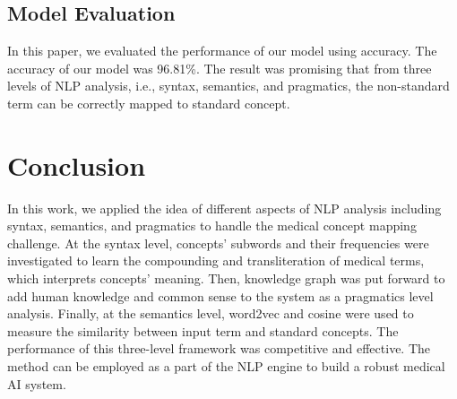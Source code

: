 \documentclass{article}
\begin{document}
\subsection{Model Evaluation}
In this paper, we evaluated the performance of our model using accuracy. The accuracy of our model was 96.81\%. The result was promising that from three levels of NLP analysis, i.e., syntax, semantics, and pragmatics, the non-standard term can be correctly mapped to standard concept.

\section{Conclusion}
In this work, we applied the idea of different aspects of NLP analysis including syntax, semantics, and pragmatics to handle the medical concept mapping challenge. At the syntax level, concepts' subwords and their frequencies were investigated to learn the compounding and transliteration of medical terms, which interprets concepts' meaning. Then, knowledge graph was put forward to add human knowledge and common sense to the system as a pragmatics level analysis. Finally, at the semantics level, word2vec and cosine were used to measure the similarity between input term and standard concepts. The performance of this three-level framework was competitive and effective. The method can be employed as a part of the NLP engine to build a robust medical AI system. 



\end{document}
